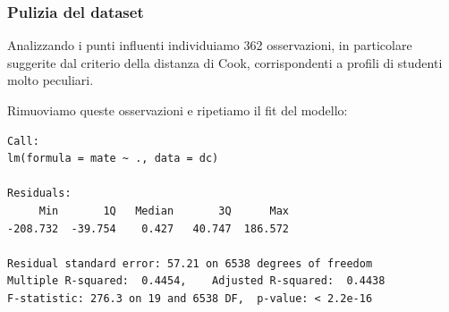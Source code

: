 \documentclass{beamer}
\begin{document}
\begin{frame}[fragile]
\frametitle{Pulizia del dataset}
Analizzando i punti influenti individuiamo 362 osservazioni, in particolare suggerite dal criterio della distanza di Cook, corrispondenti a profili di studenti molto peculiari. %




\end{frame}




\begin{frame}[fragile]
Rimuoviamo queste osservazioni e ripetiamo il fit del modello:
{\scriptsize
\begin{verbatim}
Call:
lm(formula = mate ~ ., data = dc)

Residuals:
     Min       1Q   Median       3Q      Max 
-208.732  -39.754    0.427   40.747  186.572 

Residual standard error: 57.21 on 6538 degrees of freedom
Multiple R-squared:  0.4454,	Adjusted R-squared:  0.4438 
F-statistic: 276.3 on 19 and 6538 DF,  p-value: < 2.2e-16
\end{verbatim}
}
\end{frame}
\end{document}
